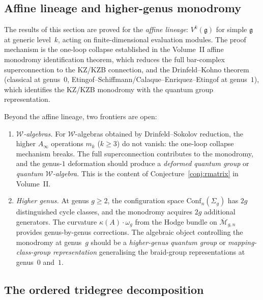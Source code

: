 \subsection{Affine lineage and higher-genus monodromy}
\label{sec:genus1-frontier}

\begin{remark}[Scope]
\label{rem:genus1-scope}
The results of this section are proved for the \emph{affine lineage}:
$V^k(\mathfrak{g})$ for simple $\mathfrak{g}$ at generic level~$k$,
acting on finite-dimensional evaluation modules. The proof mechanism
is the one-loop collapse established in the Volume~II affine
monodromy identification theorem,
which reduces the full bar-complex superconnection to the KZ/KZB
connection, and the Drinfeld--Kohno theorem (classical at genus~$0$,
Etingof--Schiffmann/Calaque--Enriquez--Etingof at genus~$1$), which
identifies the KZ/KZB monodromy with the quantum group representation.

Beyond the affine lineage, two frontiers are open:
\begin{enumerate}[label=\textup{(\alph*)}]
\item \emph{$\mathcal{W}$-algebras.}
For $\mathcal{W}$-algebras obtained by Drinfeld--Sokolov reduction,
the higher $A_\infty$ operations $m_k$ ($k \geq 3$) do not vanish:
the one-loop collapse mechanism breaks. The full superconnection
contributes to the monodromy, and the genus-$1$ deformation should
produce a \emph{deformed quantum group} or \emph{quantum
$\mathcal{W}$-algebra}. This is the content of
Conjecture~\ref*{conj:rmatrix} in Volume~II.

\item \emph{Higher genus.}
At genus $g \geq 2$, the configuration space
$\mathrm{Conf}_n(\Sigma_g)$ has $2g$ distinguished cycle classes,
and the monodromy acquires $2g$ additional generators. The
curvature $\kappa(A) \cdot \omega_g$ from the Hodge bundle on
$\overline{\mathcal{M}}_{g,n}$ provides genus-by-genus corrections.
The algebraic object controlling the monodromy at genus~$g$ should be
a \emph{higher-genus quantum group} or \emph{mapping-class-group
representation} generalising the braid-group representations at
genus~$0$ and~$1$.
\end{enumerate}
\end{remark}

\subsection{The ordered tridegree decomposition}
\label{subsec:ordered-tridegree}

